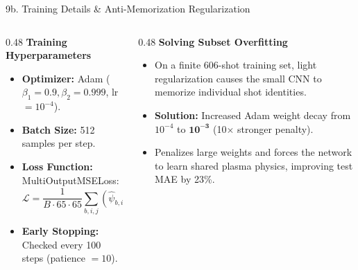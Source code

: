 \documentclass[aspectratio=169, 10pt]{beamer}
\begin{document}
\begin{frame}{9b. Training Details \& Anti-Memorization Regularization}
  \begin{columns}[T]
    \begin{column}{0.48\textwidth}
      \textbf{\color{NavyBlue} Training Hyperparameters}
      \begin{itemize}
        \item \textbf{Optimizer:} Adam ($\beta_1 = 0.9, \beta_2 = 0.999$, lr $= 10^{-4}$).
        \item \textbf{Batch Size:} 512 samples per step.
        \item \textbf{Loss Function:} MultiOutputMSELoss:
          $$\mathcal{L} = \frac{1}{B \cdot 65 \cdot 65} \sum_{b, i, j} \left(\hat{\psi}_{b,i,j} - \psi_{b,i,j}\right)^2$$
        \item \textbf{Early Stopping:} Checked every 100 steps (patience $= 10$).
      \end{itemize}
    \end{column}

    \begin{column}{0.48\textwidth}
      \textbf{\color{NavyBlue} Solving Subset Overfitting}
      \begin{itemize}
        \item On a finite 606-shot training set, light regularization causes the small CNN to memorize individual shot identities.
        \item \textbf{Solution:} Increased Adam weight decay from $10^{-4}$ to $\mathbf{10^{-3}}$ (10$\times$ stronger penalty).
        \item Penalizes large weights and forces the network to learn shared plasma physics, improving test MAE by 23\%.
      \end{itemize}
    \end{column}
  \end{columns}
\end{frame}
\end{document}
